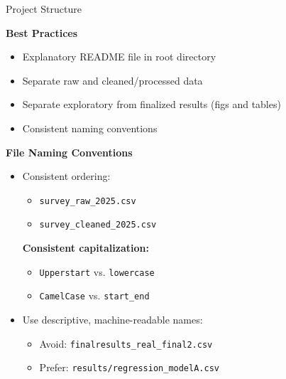 \documentclass{beamer}
\begin{document}
\begin{frame}{Project Structure}

\textbf{Best Practices}
\begin{itemize}
    \item Explanatory README file in root directory
    \item Separate raw and cleaned/processed data
    \item Separate exploratory from finalized results (figs and tables)
    \item Consistent naming conventions
\end{itemize}

\vspace{0.5em}

\textbf{File Naming Conventions}

\begin{itemize}
    \item Consistent ordering:
    \begin{itemize}
        \item \texttt{survey\_raw\_2025.csv}
        \item \texttt{survey\_cleaned\_2025.csv}
    \end{itemize}
    \textbf{Consistent capitalization:}
    \begin{itemize}
        \item \texttt{Upperstart} vs. \texttt{lowercase}
        \item \texttt{CamelCase} vs. \texttt{start\_end}
    \end{itemize}
    \item Use descriptive, machine-readable names:
    \begin{itemize}
        \item Avoid: \texttt{finalresults\_real\_final2.csv}
        \item Prefer: \texttt{results/regression\_modelA.csv}
    \end{itemize}
\end{itemize}

\end{frame}
\end{document}
